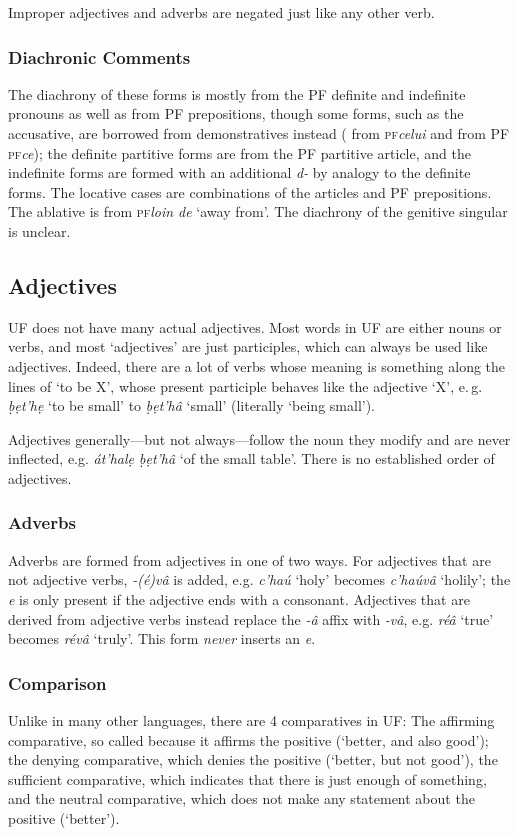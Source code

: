 \documentclass[a4paper, 12pt, twoside, final]{article}
\def\pfabbr{{\normalfont\scshape pf\space}}
\def\pf#1{\pfabbr\textit{#1}}
\let \w \textit
\begin{document}
Improper adjectives and adverbs are negated just like any other verb.

\subsubsection{Diachronic Comments}
The diachrony of these forms is mostly from the PF definite and indefinite pronouns as well as from PF prepositions, though
some forms, such as the
accusative, are borrowed from demonstratives instead ( from \pf{celui} and  from PF \pf{ce}); the definite
partitive forms are from the PF partitive article, and
the indefinite forms are formed with an additional \w{d-} by analogy to the definite forms. The locative cases are combinations
of the articles and PF prepositions. The ablative is from \pf{loin de} ‘away from’. The diachrony of the genitive singular
is unclear.

\subsection{Adjectives}
UF does not have many actual adjectives. Most words in UF are either nouns or verbs, and most ‘adjectives’ are just
participles, which can always be used like adjectives. Indeed, there are a lot of verbs whose meaning is something
along the lines of ‘to be X’, whose present participle behaves like the adjective ‘X’, e.\,g. \w{ḅẹt’hẹ} ‘to be small’
to \w{ḅẹt’hâ} ‘small’ (literally ‘being small’).

Adjectives generally—but not always—follow the noun they modify and are never inflected, e.g. \w{át’halẹ ḅẹt’hâ} ‘of the small table’.
There is no established order of adjectives.

\subsubsection{Adverbs}
Adverbs are formed from adjectives in one of two ways. For adjectives that are not adjective verbs, \w{-(é)vâ} is added,
e.g. \w{c’haú} ‘holy’ becomes \w{c’haúvâ} ‘holily’; the \w{e} is only present if the adjective ends with a consonant. Adjectives that
are derived from adjective verbs instead replace the \w{-â} affix with \w{-vâ}, e.g. \w{réâ} ‘true’ becomes \w{révâ} ‘truly’. This
form \textit{never} inserts an \textit{e}.

\subsubsection{Comparison}\label{subsubsec:comparison}
Unlike in many other languages, there are 4 comparatives in UF: The affirming comparative, so called
because it affirms the positive (‘better, and also good’); the denying comparative, which denies the positive
(‘better, but not good’), the sufficient comparative, which indicates that there is just enough of something,
and the neutral comparative, which does not make any statement about the positive (‘better’).
\end{document}
